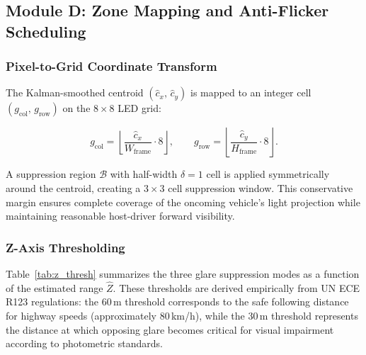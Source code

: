 \documentclass{jstarticle}
\theoremstyle{remark}
\begin{document}
\subsection{Module D: Zone Mapping and Anti-Flicker Scheduling}
\label{subsec:zone}

\subsubsection{Pixel-to-Grid Coordinate Transform}

The Kalman-smoothed centroid $(\hat{c}_x,\,\hat{c}_y)$ is mapped to
an integer cell $(g_{\mathrm{col}},\,g_{\mathrm{row}})$ on the
$8\times8$ LED grid:

\begin{equation}
g_{\mathrm{col}} = \left\lfloor
  \frac{\hat{c}_x}{W_{\mathrm{frame}}} \cdot 8
\right\rfloor, \qquad
g_{\mathrm{row}} = \left\lfloor
  \frac{\hat{c}_y}{H_{\mathrm{frame}}} \cdot 8
\right\rfloor.
\label{eq:zone_map}
\end{equation}

A suppression region $\mathcal{B}$ with half-width $\delta = 1$ cell is
applied symmetrically around the centroid, creating a $3\times3$ cell suppression window. This conservative margin ensures complete coverage of the oncoming vehicle's light projection while maintaining reasonable host-driver forward visibility.

\subsubsection{Z-Axis Thresholding}

Table~\ref{tab:z_thresh} summarizes the three glare suppression modes
as a function of the estimated range $\hat{Z}$. These thresholds are
derived empirically from UN ECE R123 regulations: the 60\,m threshold
corresponds to the safe following distance for highway speeds (approximately
80\,km/h), while the 30\,m threshold represents the distance at which
opposing glare becomes critical for visual impairment according to
photometric standards.

\begin{table}[H]
\centering
\caption{Z-axis glare suppression activation thresholds}
\label{tab:z_thresh}
\end{table}
\end{document}
